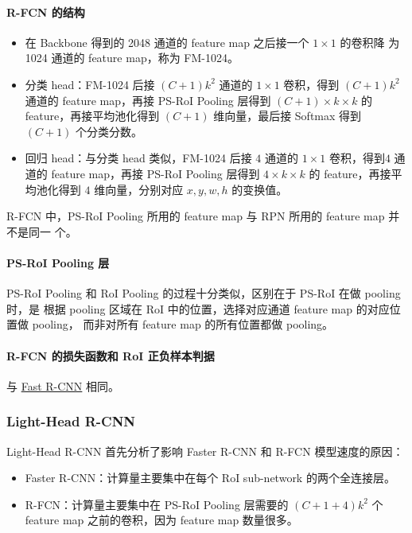 \paragraph{R-FCN 的结构}

\begin{itemize}
  \item 在 Backbone 得到的 2048 通道的 feature map 之后接一个 $1 \times 1$ 的卷积降
    为 1024 通道的 feature map，称为 FM-1024。
  \item 分类 head：FM-1024 后接 $(C+1)k^2$ 通道的 $1 \times 1$ 卷积，得到
    $(C+1)k^2$ 通道的 feature map，再接 PS-RoI Pooling 层得到 $(C+1) \times k
    \times k$ 的 feature，再接平均池化得到 $(C+1)$ 维向量，最后接 Softmax 得到
    $(C+1)$ 个分类分数。
  \item 回归 head：与分类 head 类似，FM-1024 后接 $4$ 通道的 $1 \times 1$
    卷积，得到$4$ 通道的 feature map，再接 PS-RoI Pooling 层得到 $4
    \times k \times k$ 的 feature，再接平均池化得到 $4$ 维向量，分别对应 $x, y,
    w, h$ 的变换值。
\end{itemize}

R-FCN 中，PS-RoI Pooling 所用的 feature map 与 RPN 所用的 feature map 并不是同一
个。

\paragraph{PS-RoI Pooling 层}
PS-RoI Pooling 和 RoI Pooling 的过程十分类似，区别在于 PS-RoI 在做 pooling 时，是
根据 pooling 区域在 RoI 中的位置，选择对应通道 feature map 的对应位置做 pooling，
而非对所有 feature map 的所有位置都做 pooling。

\paragraph{R-FCN 的损失函数和 RoI 正负样本判据}
与 \hyperref[subsec:Fast-R-CNN]{Fast R-CNN} 相同。

\subsubsection{Light-Head R-CNN}
Light-Head R-CNN 首先分析了影响 Faster R-CNN 和 R-FCN 模型速度的原因：

\begin{itemize}
  \item Faster R-CNN：计算量主要集中在每个 RoI sub-network 的两个全连接层。
  \item R-FCN：计算量主要集中在 PS-RoI Pooling 层需要的 $(C+1+4)k^2$ 个 feature
    map 之前的卷积，因为 feature map 数量很多。
\end{itemize}

